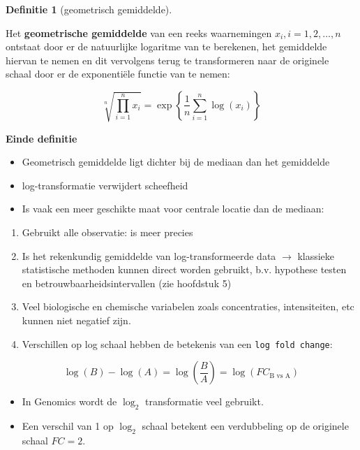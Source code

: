 \documentclass[
  12pt,dutch,coursenotes]{book}
\providecommand{\tightlist}{%
  \setlength{\itemsep}{0pt}\setlength{\parskip}{0pt}}
\theoremstyle{definition}
\newtheorem{definition}{Definitie}[chapter]
\theoremstyle{definition}
\theoremstyle{definition}
\theoremstyle{remark}
\begin{document}
\begin{definition}[geometrisch gemiddelde]
\protect\hypertarget{def:unnamed-chunk-99}{}{\label{def:unnamed-chunk-99} \iffalse (geometrisch gemiddelde) \fi{} }
\end{definition}
Het \textbf{geometrische gemiddelde} van een reeks waarnemingen \(x_i, i=1, 2, \dots, n\) ontstaat door er de natuurlijke logaritme van te berekenen, het
gemiddelde hiervan te nemen en dit vervolgens terug te transformeren naar de
originele schaal door er de exponentiële functie van te nemen:

\begin{equation*}
\sqrt[n]{\prod\limits_{i=1}^n x_i} = \exp\left\{\frac{1}{n} \sum_{i=1}^n \log(x_i)\right\}
\end{equation*}

\textbf{Einde definitie}

\begin{itemize}
\item
  Geometrisch gemiddelde ligt dichter bij de mediaan dan het gemiddelde
\item
  log-transformatie verwijdert scheefheid
\item
  Is vaak een meer geschikte maat voor centrale locatie dan de mediaan:
\end{itemize}

\begin{enumerate}
\def\labelenumi{\arabic{enumi}.}
\tightlist
\item
  Gebruikt alle observatie: is meer precies
\item
  Is het rekenkundig gemiddelde van log-transformeerde data \(\rightarrow\) klassieke statistische methoden kunnen direct worden gebruikt, b.v. hypothese testen en betrouwbaarheidsintervallen (zie hoofdstuk 5)
\item
  Veel biologische en chemische variabelen zoals concentraties, intensiteiten, etc kunnen niet negatief zijn.
\item
  Verschillen op log schaal hebben de betekenis van een \texttt{log\ fold\ change}:
\end{enumerate}

\[
\log (B) - \log(A)= \log(\frac{B}{A})=\log(FC_\text{B vs A})
\]

\begin{itemize}
\item
  In Genomics wordt de \(\log_2\) transformatie veel gebruikt.
\item
  Een verschil van 1 op \(\log_2\) schaal betekent een verdubbeling op de originele schaal \(FC=2\).
\end{itemize}
\end{document}
